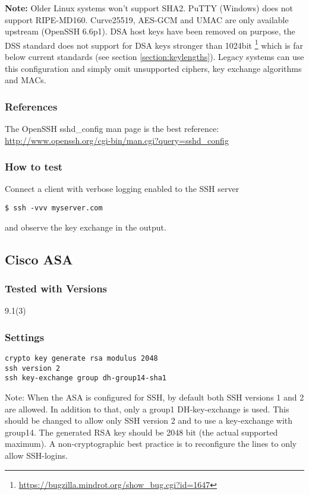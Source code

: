 \textbf{Note:} Older Linux systems won't support SHA2. PuTTY (Windows) does not support
RIPE-MD160. Curve25519, AES-GCM and UMAC are only available upstream (OpenSSH
6.6p1). DSA host keys have been removed on purpose, the DSS standard does not
support for DSA keys stronger than 1024bit
\footnote{\url{https://bugzilla.mindrot.org/show_bug.cgi?id=1647}} which is far
below current standards (see section \ref{section:keylengths}). Legacy systems
can use this configuration and simply omit unsupported ciphers, key exchange
algorithms and MACs.  

\subsubsection{References}
The OpenSSH sshd\_config  man page is the best reference: \url{http://www.openssh.org/cgi-bin/man.cgi?query=sshd_config}

\subsubsection{How to test}
Connect a client with verbose logging enabled to the SSH server
\begin{lstlisting}
$ ssh -vvv myserver.com
\end{lstlisting}and observe the key exchange in the output.


\subsection{Cisco ASA}
\subsubsection{Tested with Versions}
\begin{itemize*}
  \item 9.1(3)
\end{itemize*}


\subsubsection{Settings}
\begin{lstlisting}
crypto key generate rsa modulus 2048
ssh version 2
ssh key-exchange group dh-group14-sha1
\end{lstlisting}
Note: When the ASA is configured for SSH, by default both SSH versions 1 and 2 are allowed. In addition to that, only a group1 DH-key-exchange is used. This should be changed to allow only SSH version 2 and to use a key-exchange with group14. The generated RSA key should be 2048 bit (the actual supported maximum). A non-cryptographic best practice is to reconfigure the lines to only allow SSH-logins.

